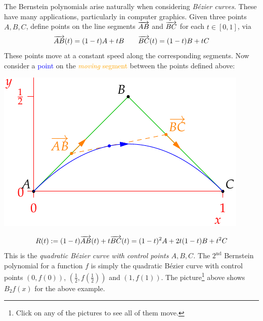 \begin{minipage}[t]{0.53\linewidth}\vspace{0pt}
	The Bernstein polynomials arise naturally when considering \emph{Bézier curves.} These have many applications, particularly in computer graphics. Given three points $A,B,C$, define points on the line segments $\overrightarrow{AB}$ and $\overrightarrow{BC}$ for each $t\in[0,1]$, via
	\[
		\overrightarrow{AB}(t)=(1-t)A+tB\qquad \overrightarrow{BC}(t)=(1-t)B+tC
	\]
	These points move at a constant speed along the corresponding segments. Now consider a \textcolor{blue}{point} on the \textcolor{orange}{\emph{moving} segment} between the points defined above:
\end{minipage}
\hfill
\begin{minipage}[t]{0.46\linewidth}\vspace{0pt}
	\flushright\href{http://www.math.uci.edu/~ndonalds/math140b/bezier.html}{\includegraphics[scale=0.95]{bezier2}}
\end{minipage}
\smallbreak

\[
	R(t):=(1-t)\overrightarrow{AB}(t)+t\overrightarrow{BC}(t) =(1-t)^2A+2t(1-t)B+t^2C
\]
This is the \emph{quadratic Bézier curve with control points $A,B,C$.} The $2^\text{nd}$ Bernstein polynomial for a function $f$ is simply the quadratic Bézier curve with control points $\left(0,f(0)\right)$, $\left(\frac 12,f(\frac 12)\right)$ and $\left(1,f(1)\right)$. The picture\footnote{%
	Click on any of the pictures to see all of them move.%
} above shows $B_2f(x)$ for the above example.\medbreak

